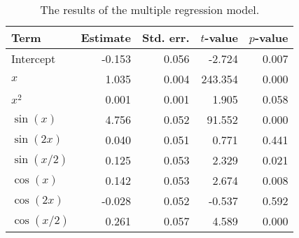 \begin{table}[!h]

\caption{\label{tab:multiple-regression}The results of the multiple regression model.}
\centering
\begin{tabular}{lrrrr}
\toprule
Term & Estimate & Std. err. & \(t\)-value & \(p\)-value\\
\midrule
Intercept & -0.153 & 0.056 & -2.724 & 0.007\\
\(x\) & 1.035 & 0.004 & 243.354 & 0.000\\
\(x^2\) & 0.001 & 0.001 & 1.905 & 0.058\\
\(\sin(x)\) & 4.756 & 0.052 & 91.552 & 0.000\\
\(\sin(2x)\) & 0.040 & 0.051 & 0.771 & 0.441\\
\(\sin(x/2)\) & 0.125 & 0.053 & 2.329 & 0.021\\
\(\cos(x)\) & 0.142 & 0.053 & 2.674 & 0.008\\
\(\cos(2x)\) & -0.028 & 0.052 & -0.537 & 0.592\\
\(\cos(x/2)\) & 0.261 & 0.057 & 4.589 & 0.000\\
\bottomrule
\end{tabular}
\end{table}